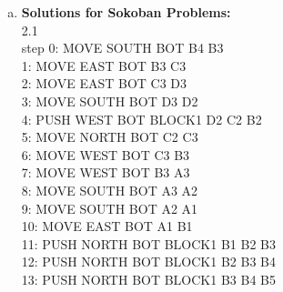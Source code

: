\documentclass[]{article}
\begin{document}
	\begin{enumerate}[(a)]
		\item \textbf{Solutions for Sokoban Problems:}\\
		
		2.1\\
		step    0: MOVE SOUTH BOT B4 B3\\
		        1: MOVE EAST BOT B3 C3\\
		        2: MOVE EAST BOT C3 D3\\
		        3: MOVE SOUTH BOT D3 D2\\
		        4: PUSH WEST BOT BLOCK1 D2 C2 B2\\
		        5: MOVE NORTH BOT C2 C3\\
		        6: MOVE WEST BOT C3 B3\\
		        7: MOVE WEST BOT B3 A3\\
		        8: MOVE SOUTH BOT A3 A2\\
		        9: MOVE SOUTH BOT A2 A1\\
		       10: MOVE EAST BOT A1 B1\\
		       11: PUSH NORTH BOT BLOCK1 B1 B2 B3\\
		       12: PUSH NORTH BOT BLOCK1 B2 B3 B4\\
		       13: PUSH NORTH BOT BLOCK1 B3 B4 B5\\
		

\end{enumerate}
\end{document}
